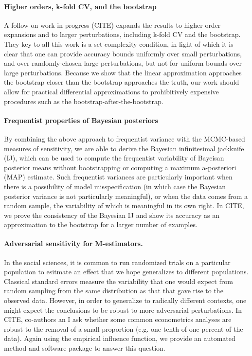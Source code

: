 \paragraph{Higher orders, k-fold CV, and the bootstrap}

A follow-on work in progress (CITE) expands the results to higher-order
expansions and to larger perturbations, including k-fold CV and the bootstrap.
They key to all this work is a set complexity condition, in light of which it is
clear that one can provide accuracy bounds uniformly over small perturbations,
and over randomly-chosen large perturbations, but not for uniform bounds over
large perturbations.  Because we show that the linear approximation approaches
the bootstrap closer than the bootstrap approaches the truth, our work
should allow for practical differential approximations to prohibitively
expensive procedures such as the bootstrap-after-the-bootstrap.


\paragraph{Frequentist properties of Bayesian posteriors}

By combining the above approach to frequentist variance with the MCMC-based
measures of sensitivity, we are able to derive the Bayesian infinitesimal
jackknife (IJ), which can be used to compute the frequentist variability
of Bayeisan posterior means without bootstrapping or computing a maximum
a-posteriori (MAP) estimate.  Such frequentist variances are particularly
important when there is a possibility of model misspecification (in which
case the Bayesian posterior variance is not particularly meaningful),
or when the data comes from a random sample, the variability of which
is meaningful in its own right.  In CITE, we prove the consistency
of the Bayesian IJ and show its accuracy as an approximation to the bootstrap
for a larger number of examples.


\paragraph{Adversarial sensitivity for M-estimators.}

In the social sciences, it is common to run randomized trials on a particular
population to esitmate an effect that we hope generalizes to different
populations.  Classical standard errors measure the variability that one
would expect from random sampling from the same distribution as that that
gave rise to the observed data.  However, in order to generalize to radically
different contexts, one might expect the conclusions to be robust to more
adversarial perturbations.  In CITE, co-authors an I ask whether some
common econometrics analyses are robust to the removal of a small proportion
(e.g. one tenth of one percent of the data).  Again using the empirical
influence function, we provide an automated method and software package
to answer this question.

